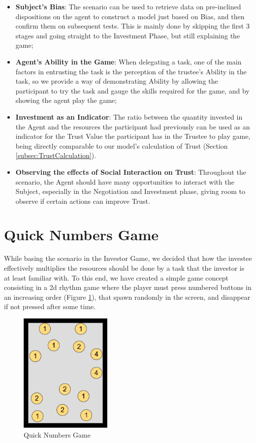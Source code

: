 \begin{itemize}
    \item \textbf{Subject's Bias}: The scenario can be used to retrieve data on pre-inclined dispositions on the agent to construct a model just based on Bias, and then confirm them on subsequent tests. This is mainly done by skipping the first 3 stages and going straight to the Investment Phase, but still explaining the game;
    \item \textbf{Agent's Ability in the Game}: When delegating a task, one of the main factors in entrusting the task is the perception of the trustee's Ability in the task, so we provide a way of demonstrating Ability by allowing the participant to try the task and gauge the skills required for the game, and by showing the agent play the game;
    \item \textbf{Investment as an Indicator}: The ratio between the quantity invested in the Agent and the resources the participant had previously can be used as an indicator for the Trust Value the participant has in the Trustee to play game, being directly comparable to our model's calculation of Trust (Section \ref{subsec:TrustCalculation}).
    \item \textbf{Observing the effects of Social Interaction on Trust}: Throughout the scenario, the Agent should have many opportunities to interact with the Subject, especially in the Negotiation and Investment phase, giving room to observe if certain actions can improve Trust.
\end{itemize}


\section{Quick Numbers Game}
\label{sec:QuickNumbersGame}
While basing the scenario in the Investor Game, we decided that how the investee effectively multiplies the resources should be done by a task that the investor is at least familiar with. To this end, we have created a simple game concept consisting in a 2d rhythm game where the player must press numbered buttons in an increasing order (Figure \ref{fig:QuickNumbersGame}), that spawn randomly in the screen, and disappear if not pressed after some time.

\begin{figure}[hbt]
    \centering
    \includegraphics[width=0.4\textwidth]{figures/FallingBoltsDiagram.png}
    \caption{Quick Numbers Game}
    \label{fig:QuickNumbersGame}
\end{figure}

